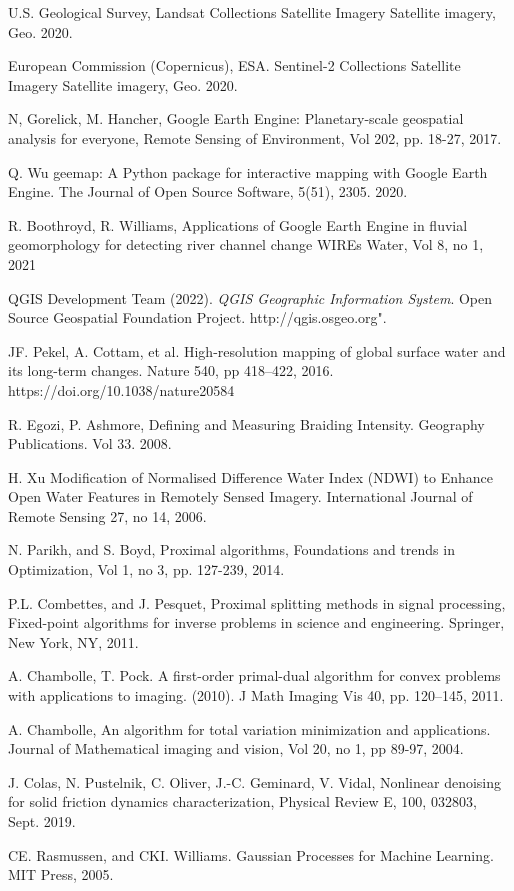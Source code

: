 \documentclass[12pt]{article}
\begin{document}
\begin{thebibliography}{99}

 U.S. Geological Survey,
  {Landsat Collections Satellite Imagery}
  Satellite imagery, Geo. 2020.
  
 European Commission (Copernicus), ESA.
  {Sentinel-2 Collections Satellite Imagery}
  Satellite imagery, Geo. 2020.
  
 N, Gorelick, M. Hancher,
 Google Earth Engine: Planetary-scale geospatial analysis for everyone,
 Remote Sensing of Environment, Vol 202, pp. 18-27, 2017.
 
  Q. Wu
  {geemap: A Python package for interactive mapping with Google Earth Engine}. 
  The Journal of Open Source Software, 5(51), 2305. 2020.

 R. Boothroyd, R. Williams, 
 Applications of Google Earth Engine in fluvial geomorphology for detecting river channel change
 WIREs Water, Vol 8, no 1, 2021

 QGIS Development Team (2022). 
  \emph{QGIS Geographic Information System}.
  Open Source Geospatial Foundation Project. http://qgis.osgeo.org".

 JF. Pekel, A. Cottam, et al.
  {High-resolution mapping of global surface water and its long-term changes.}
  Nature 540, pp 418–422, 2016. https://doi.org/10.1038/nature20584
  
 R. Egozi, P. Ashmore,
  Defining and Measuring Braiding Intensity.
  Geography Publications. Vol 33. 2008.
  
 H. Xu
  {Modification of Normalised Difference Water Index (NDWI) to Enhance Open Water Features in Remotely Sensed Imagery.}
  International Journal of Remote Sensing 27, no 14, 2006.

 N. Parikh, and S. Boyd,
  Proximal algorithms, Foundations and trends in Optimization,
  Vol 1, no 3, pp. 127-239, 2014.

 P.L. Combettes, and J. Pesquet,
  Proximal splitting methods in signal processing, Fixed-point algorithms for inverse problems in science and engineering.
  Springer, New York, NY, 2011.

 A. Chambolle, T. Pock.
  {A first-order primal-dual algorithm for convex problems with applications to imaging.} (2010).
  J Math Imaging Vis 40, pp. 120–145, 2011.

 A. Chambolle,
  An algorithm for total variation minimization and applications.
  Journal of Mathematical imaging and vision, Vol 20, no 1, pp 89-97, 2004.

 J. Colas, N. Pustelnik, C. Oliver, J.-C. Geminard, V. Vidal,
  Nonlinear denoising for solid friction dynamics characterization, 
  Physical Review E, 100, 032803, Sept. 2019.

 CE. Rasmussen, and CKI. Williams.
  Gaussian Processes for Machine Learning.
  MIT Press, 2005.
\end{thebibliography}
\end{document}
